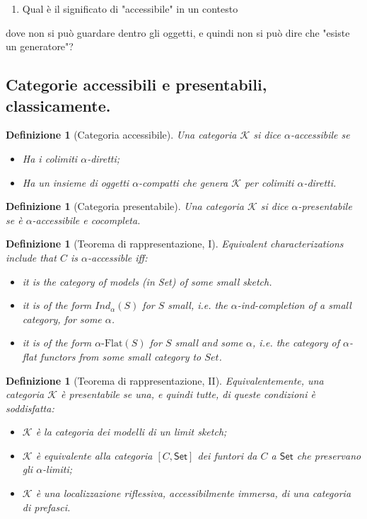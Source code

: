 \documentclass[11pt]{article}
\def\Set{\mathsf{Set}}
\theoremstyle{reference}
\newtheorem{definition}[theorem]{Definizione}
\begin{document}
\begin{enumerate}
\item Qual è il significato di "accessibile" in un contesto
\end{enumerate}
dove non si può guardare dentro gli oggetti, e quindi non
si può dire che "esiste un generatore"?

\subsection{Categorie accessibili e presentabili, classicamente.}
\label{sec:orgc255d6b}

\begin{definition}[Categoria accessibile]
Una categoria $\mathcal K$ si dice $\alpha$\hyp{}accessibile se 
\begin{itemize}
\item Ha i colimiti $\alpha$\hyp{}diretti;
\item Ha un insieme di oggetti $\alpha$\hyp{}compatti che genera $\mathcal K$ per colimiti $\alpha$\hyp{}diretti.
\end{itemize}
\end{definition}
\begin{definition}[Categoria presentabile]
Una categoria $\mathcal K$ si dice $\alpha$\hyp{}presentabile se è $\alpha$\hyp{}accessibile e cocompleta.
\end{definition}
\begin{definition}[Teorema di rappresentazione, I]
Equivalent characterizations include that $C$ is $\alpha$\hyp{}accessible iff:
\begin{itemize}
\item it is the category of models (in Set) of some small sketch.
\item it is of the form $Ind_\alpha(S)$ for $S$ small, i.e. the $\alpha$\hyp{}ind-completion of a small category, for some $\alpha$.
\item it is of the form $\alpha\text{-Flat}(S)$ for $S$ small and some $\alpha$, i.e. the category of $\alpha$\hyp{}flat functors from some small category to $Set$.
\end{itemize}
\end{definition}
\begin{definition}[Teorema di rappresentazione, II]
Equivalentemente, una categoria $\mathcal K$ è presentabile se una, e quindi tutte, di queste condizioni è soddisfatta:
\begin{itemize}
\item $\mathcal K$ è la categoria dei modelli di un limit sketch;
\item $\mathcal K$ è equivalente alla categoria $[C,\Set]$ dei funtori da $C$ a $\Set$ che preservano gli $\alpha$\hyp{}limiti;
\item $\mathcal K$ è una localizzazione riflessiva, accessibilmente immersa, di una categoria di prefasci.
\end{itemize}
\end{definition}
\end{document}

